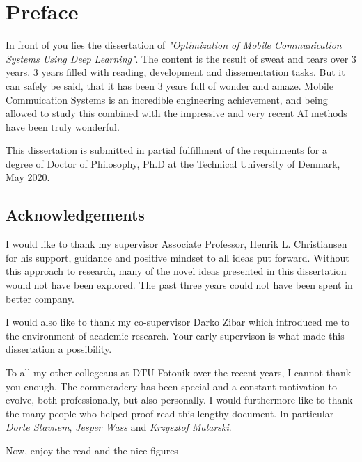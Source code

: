 \chapter*{Preface}
In front of you lies the dissertation of \emph{"Optimization of Mobile Communication Systems Using Deep Learning"}. The content is the result of sweat and tears over 3 years. 3 years filled with reading, development and dissementation tasks. But it can safely be said, that it has been 3 years full of wonder and amaze. Mobile Commuication Systems is an incredible engineering achievement, and being allowed to study this combined with the impressive and very recent AI methods have been truly wonderful. 

This dissertation is submitted in partial fulfillment of the requirments for a degree of Doctor of Philosophy, Ph.D at the Technical University of Denmark, May 2020.


\section*{Acknowledgements}

I would like to thank my supervisor Associate Professor, Henrik L. Christiansen for his support, guidance and positive mindset to all ideas put forward. Without this approach to research, many of the novel ideas presented in this dissertation would not have been explored. The past three years could not have been spent in better company.

I would also like to thank my co-supervisor Darko Zibar which introduced me to the environment of academic research. Your early supervison is what made this dissertation a possibility.

To all my other collegeaus at DTU Fotonik over the recent years, I cannot thank you enough. The commeradery has been special and a constant motivation to evolve, both professionally, but also personally.
I would furthermore like to thank the many people who helped proof-read this lengthy document. In particular \emph{Dorte Stavnem}, \emph{Jesper Wass} and \emph{Krzysztof Malarski}.

Now, enjoy the read and the nice figures

\vspace{4em}



